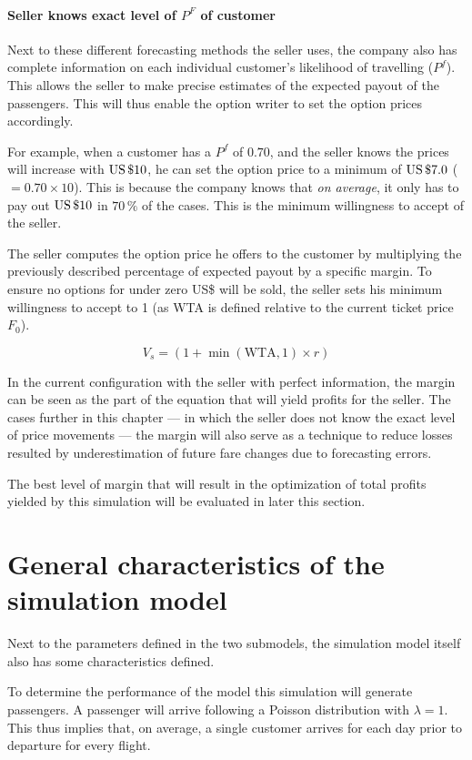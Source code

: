 \paragraph{Seller knows exact level of $P^F$ of customer}
Next to these different forecasting methods the seller uses, the company also has complete information on each individual customer's likelihood of travelling ($P^f$). This allows the seller to make precise estimates of the expected payout of the passengers. This will thus enable the option writer to set the option prices accordingly.

For example, when a customer has a $P^f$ of $0.70$, and the seller knows the prices will increase with $\mbox{US\,\$} 10$, he can set the option price to a minimum of $\mbox{US\,\$} 7.0$ ($= 0.70 \times 10$). This is because the company knows that \emph{on average}, it only has to pay out $\mbox{US\,\$} 10$ in $70\,\%$ of the cases. This is the minimum willingness to accept of the seller.

The seller computes the option price he offers to the customer by multiplying the previously described percentage of expected payout by a specific margin. To ensure no options for under zero US\$ will be sold, the seller sets his minimum willingness to accept to 1 (as WTA is defined relative to the current ticket price $F_0$).

$$ V_s = (1 + \min(\mbox{WTA}, 1) \times r) $$

In the current configuration with the seller with perfect information, the margin can be seen as the part of the equation that will yield profits for the seller. The cases further in this chapter --- in which the seller does not know the exact level of price movements --- the margin will also serve as a technique to reduce losses resulted by underestimation of future fare changes due to forecasting errors.

The best level of margin that will result in the optimization of total profits yielded by this simulation will be evaluated in later this section.



\section{General characteristics of the simulation model}
Next to the parameters defined in the two submodels, the simulation model itself also has some characteristics defined.

To determine the performance of the model this simulation will generate passengers. A passenger will arrive following a Poisson distribution with $\lambda = 1$. This thus implies that, on average, a single customer arrives for each day prior to departure for every flight.

